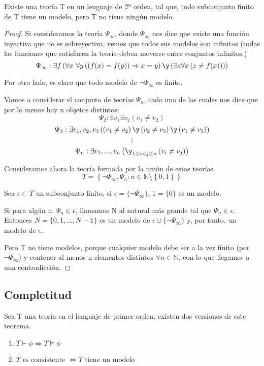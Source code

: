 \begin{theorem}\label{theorem:todo_sub_finito_modelo}
Existe una teoría T en un lenguaje de 2º orden, tal que, todo subconjunto finito de T tiene un modelo, pero T no tiene ningún modelo.
\end{theorem}
\begin{proof}
Si consideramos la teoría $\Psi_{\infty}$, donde $\Psi_{\infty}$ nos dice que existe una función inyectiva que no es sobreyectiva, vemos que todos sus modelos son infinitos (todas las funciones que satisfacen la teoría deben moverse entre conjuntos infinitos.)
$$ \Psi_{\infty}: \exists f \left(\forall x \textbf{ } \forall y \left( \left( f(x)=f(y)\right) \Rightarrow x=y \right) \y \left( \exists z \forall x \left( z \neq f(x) \right) \right) \right) $$


Por otro lado, es claro que todo modelo de $\neg \Psi_{\infty}$ es finito.

Vamos a considerar el conjunto de teorías $\Psi_n$, cada una de las cuales nos dice que por lo menos hay n objetos distintos:
$$ \Psi_2: \exists v_1 \exists v_2 \left(v_1 \neq v_2 \right) $$
$$ \Psi_3: \exists v_1, v_2, v_3 \left( \left(v_1 \neq v_2 \right) \y \left(v_2 \neq v_3 \right) \y \left(v_1 \neq v_3 \right) \right) $$
$$\vdots$$
$$ \Psi_n: \exists v_1,..., v_n \left( \y _{1\leq i < j \leq n} \left(v_i \neq v_j \right)  \right) $$

Consideramos ahora la teoría formada por la unión de estas teorías.
$$T = \left\{ \neg \Psi_{\infty}, \Psi_n : n \in \mathbb{N} \setminus \left\{0,1\right\} \right\}$$

Sea $\epsilon \subset T$ un subconjunto finito, si $\epsilon = \{\neg \Psi_{\infty} \}$, $1=\{0\}$ es un modelo.

Si para algún n, $\Psi_n \in \epsilon$, llamamos N al natural más grande tal que $\Psi_n \in \epsilon$. Entonces $N=\{0,1,...,N-1\}$ es un modelo de $\epsilon \cup \{\neg \Psi_{\infty} \}$ y, por tanto, un modelo de $\epsilon$.

Pero T no tiene modelos, porque cualquier modelo debe ser a la vez finito (por $\neg \Psi_{\infty}$) y contener al menos n elementos distintos $\forall n \in \mathbb{N}$, con lo que llegamos a una contradicción.
\end{proof}


\subsection{Completitud}

\begin{theorem}
Sea T una teoría en el lenguaje de primer orden, existen dos versiones de este teorema.
\begin{enumerate}
\item $T \vdash \phi \Leftrightarrow T \vDash \phi$

\item $T \text{ es consistente } \Leftrightarrow T \text{ tiene un modelo }$
\end{enumerate}
\end{theorem}

